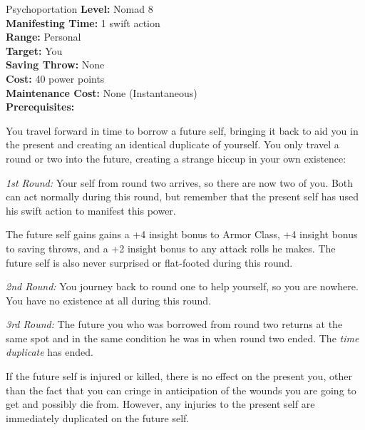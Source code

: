 {Psychoportation}
{
	\textbf{Level:}
	Nomad 8\\
	\textbf{Manifesting Time:}
	1 swift action\\
	\textbf{Range:}
	Personal\\
	\textbf{Target:}
	You\\
	\textbf{Saving Throw:}
	None\\
	\textbf{Cost:}
	40 power points\\
	\textbf{Maintenance Cost:}
	None (Instantaneous)\\
	\textbf{Prerequisites:}
	\\
}
{
	You travel forward in time to borrow a future self, bringing it back to aid you in the present and creating an identical duplicate of yourself. You only travel a round or two into the future, creating a strange hiccup in your own existence:

	\textit{1st Round:} Your self from round two arrives, so there are now two of you. Both can act normally during this round, but remember that the present self has used his swift action to manifest this power. 

	The future self gains gains a +4 insight bonus to Armor Class, +4 insight bonus to saving throws, and a +2 insight bonus to any attack rolls he makes. The future self is also never surprised or flat-footed during this round.

	\textit{2nd Round:} You journey back to round one to help yourself, so you are nowhere. You have no existence at all during this round.

	\textit{3rd Round:} The future you who was borrowed from round two returns at the same spot and in the same condition he was in when round two ended. The \emph{time duplicate} has ended.

	If the future self is injured or killed, there is no effect on the present you, other than the fact that you can cringe in anticipation of the wounds you are going to get and possibly die from. However, any injuries to the present self are immediately duplicated on the future self.
}
